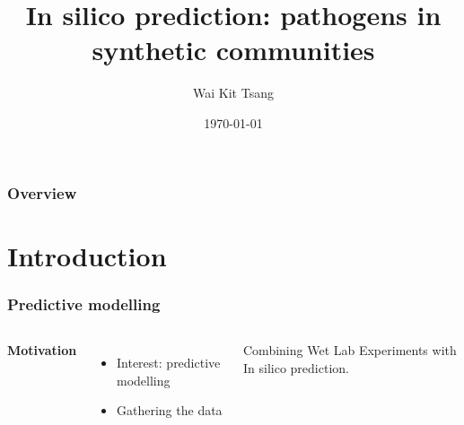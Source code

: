 \documentclass{beamer}
\title[In silico pathogens]{In silico prediction: pathogens in synthetic communities} %
\author{Wai Kit Tsang} %
\institute[LabMET \& Kermit] %
{
Promotors: Prof. dr. ir. Nico Boon \&  \\ Prof. dr. Willem Waegeman \\ tutor: dr. Ramiro V\'ilchez Vargas \& ir. Michiel Stock \\
\medskip
Ghent University \\ %
\medskip
\textit{waikit.tsang@ugent.be} %
}
\date{\today} %
\begin{document}
\begin{frame}
\titlepage %
\end{frame}

\begin{frame}
\frametitle{Overview} %
\tableofcontents %
\end{frame}


\section{Introduction} %


\begin{frame}
\frametitle{Predictive modelling}
\begin{columns}[c] %

\textbf{Motivation}
\begin{itemize}
\item Interest: predictive modelling
\item Gathering the data
 
\end{itemize}

Combining Wet Lab Experiments with In silico prediction.
\end{columns}

\end{frame}
\end{document}
